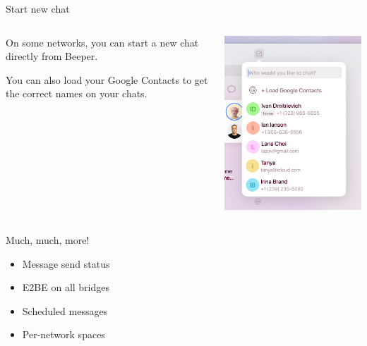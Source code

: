 \documentclass{beeper}
\begin{document}
\begin{frame}{Start new chat}
    \begin{columns}
        \begin{column}{0.6\textwidth}
            On some networks, you can start a new chat directly from Beeper.
            \vspace{1cm}

            You can also load your Google Contacts to get the correct names on
            your chats.
        \end{column}
        \begin{column}{0.4\textwidth}
            \centerline{\includegraphics[width=\textwidth]{images/start-new-chat}}
        \end{column}
    \end{columns}
\end{frame}

\begin{frame}{Much, much, more!}
    \begin{multicols}{2}
        \begin{itemize}
            \item Message send status
            \item E2BE on all bridges
            \item Scheduled messages
            \item Per-network spaces
        \end{itemize}
    \end{multicols}
\end{frame}
\end{document}
